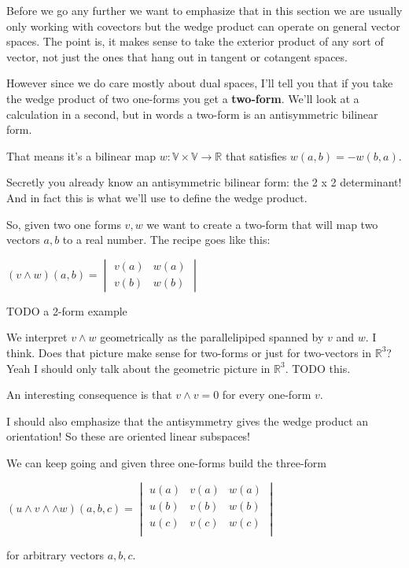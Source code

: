 \documentclass{article}
\begin{document}
Before we go any further we want to emphasize that in this section we are
usually only working with covectors but the wedge product can operate on general
vector spaces. The point is, it makes sense to take the exterior product of any sort of vector, not just the
ones that hang out in tangent or cotangent spaces.

However since we do care mostly about dual spaces, I'll tell you that if you take
the wedge product of two one-forms you get a \textbf{two-form}. We'll look at a
calculation in a second, but in words a two-form is an antisymmetric bilinear
form.

That means it's a bilinear map $w: \mathbb{V} \times \mathbb{V} \to \mathbb{R}$
that satisfies $w(a, b) = -w(b, a)$.

Secretly you already know an antisymmetric bilinear form: the 2 x 2 determinant!
And in fact this is what we'll use to define the wedge product.

So, given two one forms $v, w$ we want to create a two-form that will map two
vectors $a, b$ to a real number. The recipe goes like this:

$
(v \wedge w) (a, b) =
\begin{vmatrix}
  v (a) & w (a) \\
  v (b) & w (b)
\end{vmatrix}
$

TODO a 2-form example

We interpret $v \wedge w$ geometrically as the parallelipiped spanned by $v$ and
$w$. I think. Does that picture make sense for two-forms or just for two-vectors
in $\mathbb{R}^{3}$? Yeah I should only talk about the geometric picture in
$\mathbb{R}^{3}$. TODO this.

An interesting consequence is that $v \wedge v = 0$ for every one-form $v$.

I should also emphasize that the antisymmetry gives the wedge product an
orientation! So these are oriented linear subspaces!

We can keep going and given three one-forms build the three-form

$
(u \wedge v \wedge \wedge w) (a, b, c) =
\begin{vmatrix}
  u (a) & v (a) & w (a) \\
  u (b) & v (b) & w (b) \\
  u (c) & v (c) & w (c) \\
\end{vmatrix}
$

for arbitrary vectors $a, b, c$.
\end{document}
